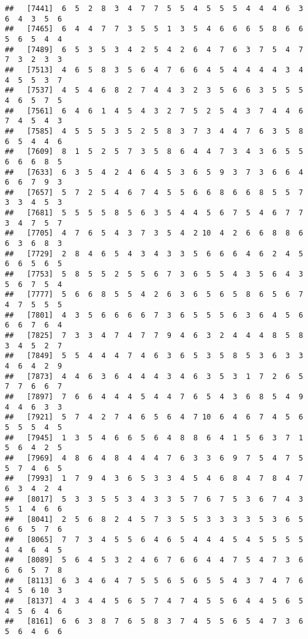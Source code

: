 \documentclass[
]{book}
\begin{document}
\begin{verbatim}
##   [7441]  6  5  2  8  3  4  7  7  5  5  4  5  5  5  4  4  4  6  3  6  4  3  5  6
##   [7465]  6  4  4  7  7  3  5  5  1  3  5  4  6  6  6  5  8  6  6  5  6  5  4  4
##   [7489]  6  5  3  5  3  4  2  5  4  2  6  4  7  6  3  7  5  4  7  7  3  2  3  3
##   [7513]  4  6  5  8  3  5  6  4  7  6  6  4  5  4  4  4  4  3  4  4  5  5  3  7
##   [7537]  4  5  4  6  8  2  7  4  4  3  2  3  5  6  6  3  5  5  5  4  6  5  7  5
##   [7561]  6  4  6  1  4  5  4  3  2  7  5  2  5  4  3  7  4  4  6  7  4  5  4  3
##   [7585]  4  5  5  5  3  5  2  5  8  3  7  3  4  4  7  6  3  5  8  6  5  4  4  6
##   [7609]  8  1  5  2  5  7  3  5  8  6  4  4  7  3  4  3  6  5  5  6  6  6  8  5
##   [7633]  6  3  5  4  2  4  6  4  5  3  6  5  9  3  7  3  6  6  4  6  6  7  9  3
##   [7657]  5  7  2  5  4  6  7  4  5  5  6  6  8  6  6  8  5  5  7  3  3  4  5  3
##   [7681]  5  5  5  5  8  5  6  3  5  4  4  5  6  7  5  4  6  7  7  3  4  7  5  7
##   [7705]  4  7  6  5  4  3  7  3  5  4  2 10  4  2  6  6  8  8  6  6  3  6  8  3
##   [7729]  2  8  4  6  5  4  3  4  3  3  5  6  6  6  4  6  2  4  5  6  6  5  6  5
##   [7753]  5  8  5  5  2  5  5  6  7  3  6  5  5  4  3  5  6  4  3  5  6  7  5  4
##   [7777]  5  6  6  8  5  5  4  2  6  3  6  5  6  5  8  6  5  6  7  4  7  5  5  5
##   [7801]  4  3  5  6  6  6  6  7  3  6  5  5  5  6  3  6  4  5  6  6  6  7  6  4
##   [7825]  7  3  3  4  7  4  7  7  9  4  6  3  2  4  4  4  8  5  8  3  4  5  2  7
##   [7849]  5  5  4  4  4  7  4  6  3  6  5  3  5  8  5  3  6  3  3  4  6  4  2  9
##   [7873]  4  4  6  3  6  4  4  4  3  4  6  3  5  3  1  7  2  6  5  7  7  6  6  7
##   [7897]  7  6  6  4  4  4  5  4  4  7  6  5  4  3  6  8  5  4  9  4  4  6  3  3
##   [7921]  5  7  4  2  7  4  6  5  6  4  7 10  6  4  6  7  4  5  6  5  5  5  4  5
##   [7945]  1  3  5  4  6  6  5  6  4  8  8  6  4  1  5  6  3  7  1  5  6  4  2  5
##   [7969]  4  8  6  4  8  4  4  4  7  6  3  3  6  9  7  5  4  7  5  5  7  4  6  5
##   [7993]  1  7  9  4  3  6  5  3  3  4  5  4  6  8  4  7  8  4  7  6  3  4  2  4
##   [8017]  5  3  3  5  5  3  4  3  3  5  7  6  7  5  3  6  7  4  3  5  1  4  6  6
##   [8041]  2  5  6  8  2  4  5  7  3  5  5  3  3  3  3  5  3  6  5  6  6  5  7  6
##   [8065]  7  7  3  4  5  5  6  4  6  5  4  4  4  5  4  5  5  5  5  4  4  6  4  5
##   [8089]  5  6  4  5  3  2  4  6  7  6  6  4  4  7  5  4  7  3  6  6  6  5  7  8
##   [8113]  6  3  4  6  4  7  5  5  6  5  6  5  5  4  3  7  4  7  6  4  5  6 10  3
##   [8137]  4  3  4  4  5  6  5  7  4  7  4  5  5  6  4  4  5  6  5  4  5  6  4  6
##   [8161]  6  6  3  8  7  6  5  8  3  7  4  5  5  6  5  4  7  3  6  5  6  4  6  6

\end{verbatim}
\end{document}
